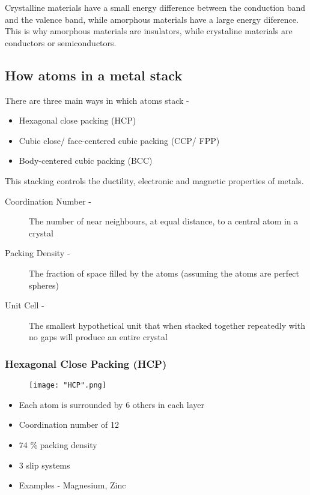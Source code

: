 \documentclass[a4paper, 12pt]{article}
\begin{document}
			Crystalline materials have a small energy difference between the conduction band and the valence band, while amorphous materials have a large energy diference. This is why amorphous materials are insulators, while crystaline materials are conductors or semiconductors.
			
			\subsection{How atoms in a metal stack}
				There are three main ways in which atoms stack -
				\begin{itemize}
					\item Hexagonal close packing (HCP)
					\item Cubic close/ face-centered cubic packing (CCP/ FPP)
					\item Body-centered cubic packing (BCC)
				\end{itemize}
				
				This stacking controls the ductility, electronic and magnetic properties of metals.
				
				\begin{description}
					\item[Coordination Number - ] The number of near neighbours, at equal distance, to a central atom in a crystal				
					\item[Packing Density - ] The fraction of space filled by the atoms (assuming the atoms are perfect spheres)
					\item[Unit Cell - ] The smallest hypothetical unit that when stacked together repeatedly with no gaps will produce an entire crystal
				\end{description}
				
				\subsubsection*{Hexagonal Close Packing (HCP)}
					
					\begin{figure}[!ht]
						\texttt{[image: "HCP".png]}
					\end{figure}
					
					\begin{itemize}
						\item Each atom is surrounded by 6 others in each layer
						\item Coordination number of 12
						\item 74 \% packing density
						\item 3 slip systems
						\item Examples - Magnesium, Zinc
					\end{itemize}
\end{document}
